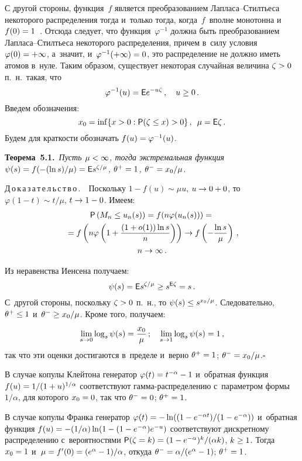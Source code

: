 \begin{multicols}{2}
С другой стороны, функция~$f$ является преобразованием
Лап\-ла\-са--Стилть\-еса некоторого распределения тогда и~только тогда,
когда~$f$~впол\-не монотонна и~$f(0)\hm=1$~\cite[гл. 13, \S 4, теорема~1]{Fel}.
Отсюда следует, что функция~$\varphi^{-1}$ должна быть
преобразованием Лап\-ла\-са--Стилть\-еса некоторого распределения, причем
в~силу условия $\varphi(0)\hm=+\infty$, а~значит,
и~$\varphi^{-1}(+\infty)\hm=0$, это распределение не должно иметь атомов
в~нуле. Таким образом, существует некоторая случайная величина
$\zeta\hm>0$ п.~н.\ такая, что
$$
\varphi^{-1}(u)={\sf E}e^{-u\zeta}\,,\quad u\ge 0\,.
$$
Введем обозначения:
$$
x_0=\inf\{x>0: {\sf P}(\zeta\le x)>0\}\,,\enskip \mu={\sf E}\zeta\,.
$$
Будем для краткости обозначать $f(u)\hm=\varphi^{-1}(u)$.

\smallskip

\noindent
\textbf{Теорема~5.1.}\ \textit{Пусть $\mu\hm<\infty$, тогда экстремальная функция
$\psi(s)\hm=f(-(\ln s)/\mu)\hm={\sf E}s^{\zeta/\mu}$,
$\theta^+\hm=1$, $\theta^-\hm=x_0/\mu$.}


\noindent
Д\,о\,к\,а\,з\,а\,т\,е\,л\,ь\,с\,т\,в\,о\,.\ \
 Поскольку $1-f(u)\sim \mu u$, $u\hm\to 0+0$, то $\varphi(1-t)\sim t/\mu$,
 $t\hm\to 1-0$.
Имеем:
\begin{multline*}
{\sf P}\left(M_n\le u_n(s)\right)=f(n\varphi(u_n(s)))={}\\
{}=f\left(n\varphi\left(1+\displaystyle\frac{\displaystyle (1+o(1))\ln s\mathstrut}{\displaystyle n\mathstrut}\right)\right)\to 
f\left(-\displaystyle\frac{\displaystyle \ln s\mathstrut}{\displaystyle \mu\mathstrut}\right)\,,\\ 
n\to\infty\,.
\end{multline*}

Из неравенства Иенсена получаем:
$$
\psi(s)={\sf E}s^{\zeta/\mu}\ge
s^{{\sf E}\zeta}=s\,.
$$ 
С~другой стороны, поскольку $\zeta\hm>0$ п.~н., то
$\psi(s)\hm\le s^{x_0/\mu}$. Следовательно, $\theta^+\hm\le 1$
и~$\theta^-\hm\ge x_0/\mu$. Кроме того, получаем:
$$
\lim\limits_{s\to 0}\log_s\psi(s)=\displaystyle\frac{\displaystyle x_0\mathstrut}{\displaystyle \mu\mathstrut}\,;\quad
\lim\limits_{s\to 1}\log_s\psi(s)=1\,,
$$
так что эти оценки
достигаются в~пределе и~верно $\theta^+\hm=1$; $\theta^-\hm=x_0/\mu$.\hfill$\square$

\smallskip

В случае копулы Клейтона генератор $\varphi(t)\hm=t^{-\alpha}-1$
и~обратная функция $f(u)\hm=1/(1+u)^{1/\alpha}$
соответствуют гам\-ма-рас\-пре\-де\-ле\-нию с~параметром формы~$1/\alpha$,
для которого $x_0\hm=0$, так что
$\theta^-\hm=0$; $\theta^+\hm=1$.

В случае копулы Франка генератор
$\varphi(t)\hm=-\ln((1-e^{-\alpha t})/(1-e^{-\alpha}))$ и~обратная функция
$f(u)\hm=-(1/\alpha)\ln(1-(1-e^{-\alpha})e^{-u})$ соответствуют
дискретному распределению с~вероятностями
${\sf P}(\zeta=k)\hm=(1-e^{-\alpha})^k/(\alpha k)$, $k\hm\ge 1$. Тогда
$x_0\hm=1$ и~$\mu\hm=f'(0)\hm=(e^\alpha-1)/\alpha$,
откуда $\theta^-\hm=\alpha/(e^\alpha-1)$; $\theta^+\hm=1$.


\end{multicols}
